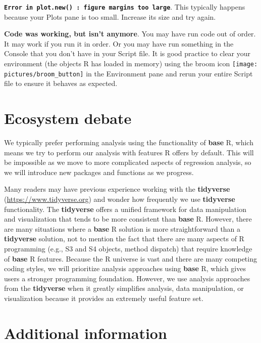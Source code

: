 \documentclass[
]{book}
\theoremstyle{definition}
\theoremstyle{definition}
\theoremstyle{definition}
\theoremstyle{definition}
\theoremstyle{remark}
\begin{document}
\textbf{\texttt{Error\ in\ plot.new()\ :\ figure\ margins\ too\ large}}. This typically happens because your Plots pane is too small. Increase its size and try again.

\textbf{Code was working, but isn't anymore}. You may have run code out of order. It may work if you run it in order. Or you may have run something in the Console that you don't have in your Script file. It is good practice to clear your environment (the objects R has loaded in memory) using the broom icon
\texttt{[image: pictures/broom\_button]} in the Environment pane and rerun your entire Script file to ensure it behaves as expected.

\hypertarget{ecosystem-debate}{%
\section{Ecosystem debate}\label{ecosystem-debate}}

We typically prefer performing analysis using the functionality of \textbf{base} R, which means we try to perform our analysis with features R offers by default. This will be impossible as we move to more complicated aspects of regression analysis, so we will introduce new packages and functions as we progress.

Many readers may have previous experience working with the \textbf{tidyverse} (\url{https://www.tidyverse.org}) and wonder how frequently we use \textbf{tidyverse} functionality. The \textbf{tidyverse} offers a unified framework for data manipulation and visualization that tends to be more consistent than \textbf{base} R. However, there are many situations where a \textbf{base} R solution is more straightforward than a \textbf{tidyverse} solution, not to mention the fact that there are many aspects of R programming (e.g., S3 and S4 objects, method dispatch) that require knowledge of \textbf{base} R features. Because the R universe is vast and there are many competing coding styles, we will prioritize analysis approaches using \textbf{base} R, which gives users a stronger programming foundation. However, we use analysis approaches from the \textbf{tidyverse} when it greatly simplifies analysis, data manipulation, or visualization because it provides an extremely useful feature set.

\hypertarget{additional-information}{%
\section{Additional information}\label{additional-information}}
\end{document}
